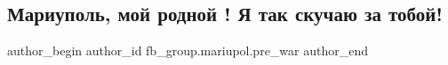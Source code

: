  
 
 
 
 

\subsection{Мариуполь, мой родной ! Я так скучаю за тобой!}
\label{sec:16_02_2023.fb.fb_group.mariupol.pre_war.4.mariupol__moi_rodnoi}

\ifcmt
 author_begin
   author_id fb_group.mariupol.pre_war
 author_end
\fi

